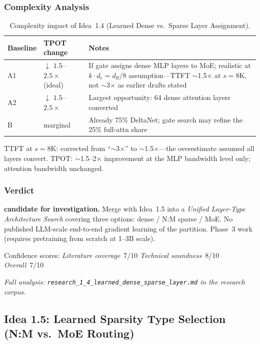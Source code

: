 \documentclass[11pt]{article}
\begin{document}
\subsubsection*{Complexity Analysis}

\begin{table}[h]
\centering
\caption{Complexity impact of Idea~1.4 (Learned Dense vs.\ Sparse Layer Assignment).}
\label{tab:complexity-1-4}
\begin{tabular}{llp{7cm}}
\toprule
\textbf{Baseline} & \textbf{TPOT change} & \textbf{Notes} \\
\midrule
A1 & $\downarrow$ $1.5$--$2.5\times$ (ideal) & If gate assigns dense MLP layers to MoE; realistic at $k \cdot d_e = d_\text{ff}/8$ assumption---TTFT $\sim$1.5$\times$ at $s=8\mathrm{K}$, not $\sim$3$\times$ as earlier drafts stated \\
A2 & $\downarrow$ $1.5$--$2.5\times$ & Largest opportunity: 64 dense attention layers converted \\
B  & marginal & Already 75\% DeltaNet; gate search may refine the 25\% full-attn share \\
\bottomrule
\end{tabular}
\end{table}

\noindent
TTFT at $s=8\mathrm{K}$: corrected from ``$\sim$3$\times$'' to $\sim$1.5$\times$---the overestimate assumed all layers convert.
TPOT: $\sim$1.5--2$\times$ improvement at the MLP bandwidth level only; attention bandwidth unchanged.

\subsubsection*{Verdict}
\textbf{candidate for investigation.}
Merge with Idea~1.5 into a \emph{Unified Layer-Type Architecture Search} covering three options: dense / N:M sparse / MoE.
No published LLM-scale end-to-end gradient learning of the partition.
Phase~3 work (requires pretraining from scratch at 1--3B scale).

\noindent
Confidence scores:
\emph{Literature coverage}~7/10 \quad
\emph{Technical soundness}~8/10 \quad
\emph{Overall}~7/10
\par\noindent\textit{Full analysis: \texttt{research\_1\_4\_learned\_dense\_sparse\_layer.md} in the research corpus.}


\subsection{Idea 1.5: Learned Sparsity Type Selection (N:M vs.\ MoE Routing)}
\label{subsec:idea-1-5}
\end{document}
